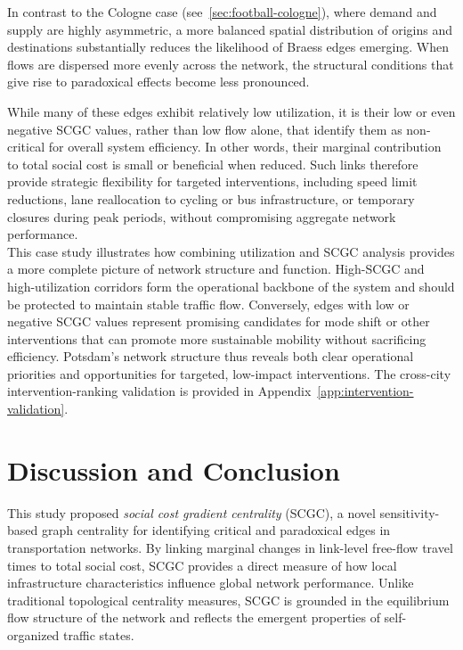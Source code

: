 \documentclass[twocolumn,english,groupedaddress, superscriptaddress,aps,pre,10pt,floatfix]{revtex4-2}
\begin{document}
In contrast to the Cologne case (see~\cref{sec:football-cologne}), where demand and supply are highly asymmetric, a more balanced spatial distribution of origins and destinations substantially reduces the likelihood of Braess edges emerging. When flows are dispersed more evenly across the network, the structural conditions that give rise to paradoxical effects become less pronounced.

While many of these edges exhibit relatively low utilization, it is their low or even negative SCGC values, rather than low flow alone, that identify them as non-critical for overall system efficiency. In other words, their marginal contribution to total social cost is small or beneficial when reduced. Such links therefore provide strategic flexibility for targeted interventions, including speed limit reductions, lane reallocation to cycling or bus infrastructure, or temporary closures during peak periods, without compromising aggregate network performance.
\\

This case study illustrates how combining utilization and SCGC analysis provides a more complete picture of network structure and function. 
High-SCGC and high-utilization corridors form the operational backbone of the system and should be protected to maintain stable traffic flow. 
Conversely, edges with low or negative SCGC values represent promising candidates for mode shift or other interventions that can promote more sustainable mobility without sacrificing efficiency. 
Potsdam’s network structure thus reveals both clear operational priorities and opportunities for targeted, low-impact interventions.
The cross-city intervention-ranking validation is provided in Appendix~\ref{app:intervention-validation}.



\clearpage

\section{Discussion and Conclusion}\label{sec:discussion}

This study proposed \emph{social cost gradient centrality} (SCGC), a novel sensitivity-based graph centrality for identifying critical and paradoxical edges in transportation networks. By linking marginal changes in link-level free-flow travel times to total social cost, SCGC provides a direct measure of how local infrastructure characteristics influence global network performance. Unlike traditional topological centrality measures, SCGC is grounded in the equilibrium flow structure of the network and reflects the emergent properties of self-organized traffic states.
\end{document}
